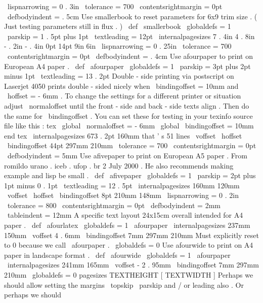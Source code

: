 {{{{{{{}
%
%
\
lispnarrowing
=
0
.
3in
\
tolerance
=
700
\
contentsrightmargin
=
0pt
\
defbodyindent
=
.
5cm
}
}
%
Use
smallerbook
to
reset
parameters
for
6x9
trim
size
.
%
(
Just
testing
parameters
still
in
flux
.
)
\
def
\
smallerbook
{
{
\
globaldefs
=
1
\
parskip
=
1
.
5pt
plus
1pt
\
textleading
=
12pt
%
\
internalpagesizes
{
7
.
4in
}
{
4
.
8in
}
%
{
-
.
2in
}
{
-
.
4in
}
%
{
0pt
}
{
14pt
}
%
{
9in
}
{
6in
}
%
%
\
lispnarrowing
=
0
.
25in
\
tolerance
=
700
\
contentsrightmargin
=
0pt
\
defbodyindent
=
.
4cm
}
}
%
Use
afourpaper
to
print
on
European
A4
paper
.
\
def
\
afourpaper
{
{
\
globaldefs
=
1
\
parskip
=
3pt
plus
2pt
minus
1pt
\
textleading
=
13
.
2pt
%
%
Double
-
side
printing
via
postscript
on
Laserjet
4050
%
prints
double
-
sided
nicely
when
\
bindingoffset
=
10mm
and
\
hoffset
=
-
6mm
.
%
To
change
the
settings
for
a
different
printer
or
situation
adjust
%
\
normaloffset
until
the
front
-
side
and
back
-
side
texts
align
.
Then
%
do
the
same
for
\
bindingoffset
.
You
can
set
these
for
testing
in
%
your
texinfo
source
file
like
this
:
%
tex
%
\
global
\
normaloffset
=
-
6mm
%
\
global
\
bindingoffset
=
10mm
%
end
tex
\
internalpagesizes
{
673
.
2pt
}
{
160mm
}
%
that
'
s
51
lines
{
\
voffset
}
{
\
hoffset
}
%
{
\
bindingoffset
}
{
44pt
}
%
{
297mm
}
{
210mm
}
%
%
\
tolerance
=
700
\
contentsrightmargin
=
0pt
\
defbodyindent
=
5mm
}
}
%
Use
afivepaper
to
print
on
European
A5
paper
.
%
From
romildo
urano
.
iceb
.
ufop
.
br
2
July
2000
.
%
He
also
recommends
making
example
and
lisp
be
small
.
\
def
\
afivepaper
{
{
\
globaldefs
=
1
\
parskip
=
2pt
plus
1pt
minus
0
.
1pt
\
textleading
=
12
.
5pt
%
\
internalpagesizes
{
160mm
}
{
120mm
}
%
{
\
voffset
}
{
\
hoffset
}
%
{
\
bindingoffset
}
{
8pt
}
%
{
210mm
}
{
148mm
}
%
%
\
lispnarrowing
=
0
.
2in
\
tolerance
=
800
\
contentsrightmargin
=
0pt
\
defbodyindent
=
2mm
\
tableindent
=
12mm
}
}
%
A
specific
text
layout
24x15cm
overall
intended
for
A4
paper
.
\
def
\
afourlatex
{
{
\
globaldefs
=
1
\
afourpaper
\
internalpagesizes
{
237mm
}
{
150mm
}
%
{
\
voffset
}
{
4
.
6mm
}
%
{
\
bindingoffset
}
{
7mm
}
%
{
297mm
}
{
210mm
}
%
%
%
Must
explicitly
reset
to
0
because
we
call
\
afourpaper
.
\
globaldefs
=
0
}
}
%
Use
afourwide
to
print
on
A4
paper
in
landscape
format
.
\
def
\
afourwide
{
{
\
globaldefs
=
1
\
afourpaper
\
internalpagesizes
{
241mm
}
{
165mm
}
%
{
\
voffset
}
{
-
2
.
95mm
}
%
{
\
bindingoffset
}
{
7mm
}
%
{
297mm
}
{
210mm
}
%
\
globaldefs
=
0
}
}
%
pagesizes
TEXTHEIGHT
[
TEXTWIDTH
]
%
Perhaps
we
should
allow
setting
the
margins
\
topskip
\
parskip
%
and
/
or
leading
also
.
Or
perhaps
we
should
}}}}
